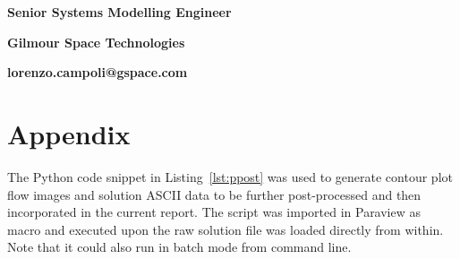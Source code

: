 \documentclass[12pt]{article}
\begin{document}
\vspace*{-1.0cm}

\hspace*{9.0cm}\textbf{Senior Systems Modelling Engineer}

\hspace*{9.0cm}\textbf{Gilmour Space Technologies}

\hspace*{9.0cm}\textbf{lorenzo.campoli@gspace.com}

\newpage



%

\newpage

\section{Appendix}
The Python code snippet in Listing~\ref{lst:ppost} was used to generate contour plot flow images and solution ASCII data to be further post-processed and then incorporated in the current report. The script was imported in Paraview as macro and executed upon the raw solution file was loaded directly from within. Note that it could also run in batch mode from command line.
\end{document}
